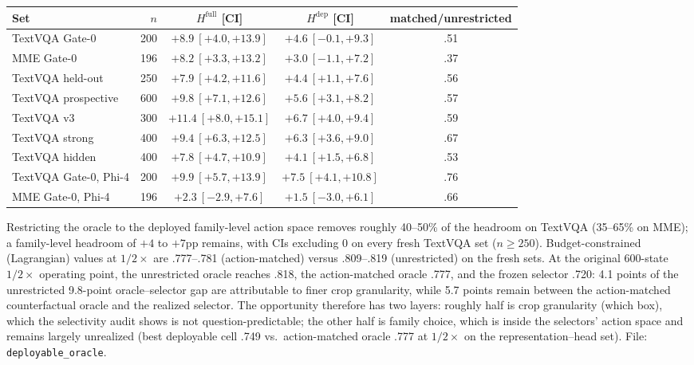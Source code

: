 \documentclass[10pt]{article}
\begin{document}
\begin{center}
\small
\begin{tabular}{lrccc}
\toprule
Set & $n$ & $H^{\mathrm{full}}$ [CI] & $H^{\mathrm{dep}}$ [CI] & matched/unrestricted \\
\midrule
TextVQA Gate-0 & 200 & $+8.9\ [+4.0,+13.9]$ & $+4.6\ [-0.1,+9.3]$ & .51 \\
MME Gate-0 & 196 & $+8.2\ [+3.3,+13.2]$ & $+3.0\ [-1.1,+7.2]$ & .37 \\
TextVQA held-out & 250 & $+7.9\ [+4.2,+11.6]$ & $+4.4\ [+1.1,+7.6]$ & .56 \\
TextVQA prospective & 600 & $+9.8\ [+7.1,+12.6]$ & $+5.6\ [+3.1,+8.2]$ & .57 \\
TextVQA v3 & 300 & $+11.4\ [+8.0,+15.1]$ & $+6.7\ [+4.0,+9.4]$ & .59 \\
TextVQA strong & 400 & $+9.4\ [+6.3,+12.5]$ & $+6.3\ [+3.6,+9.0]$ & .67 \\
TextVQA hidden & 400 & $+7.8\ [+4.7,+10.9]$ & $+4.1\ [+1.5,+6.8]$ & .53 \\
TextVQA Gate-0, Phi-4 & 200 & $+9.9\ [+5.7,+13.9]$ & $+7.5\ [+4.1,+10.8]$ & .76 \\
MME Gate-0, Phi-4 & 196 & $+2.3\ [-2.9,+7.6]$ & $+1.5\ [-3.0,+6.1]$ & .66 \\
\bottomrule
\end{tabular}
\end{center}

Restricting the oracle to the deployed family-level action space removes
roughly 40--50\% of the headroom on TextVQA (35--65\% on MME); a family-level
headroom of $+4$ to $+7$pp remains, with CIs excluding 0 on every fresh
TextVQA set ($n \ge 250$). Budget-constrained (Lagrangian) values at
$1/2\times$ are .777--.781 (action-matched) versus .809--.819
(unrestricted) on the fresh sets. At the original 600-state $1/2\times$ operating point, the
unrestricted oracle reaches .818, the action-matched oracle .777, and the
frozen selector .720: 4.1 points of the unrestricted 9.8-point
oracle--selector gap are attributable to finer crop granularity, while 5.7
points remain between the action-matched counterfactual oracle and the
realized selector. The opportunity therefore has two layers: roughly half
is crop granularity (which box), which the selectivity audit shows is not
question-predictable; the other half is family choice, which is inside the
selectors' action space and remains largely unrealized (best deployable
cell .749 vs.\ action-matched oracle .777 at $1/2\times$ on the
representation--head set). File: \texttt{deployable\_oracle}.
\end{document}
